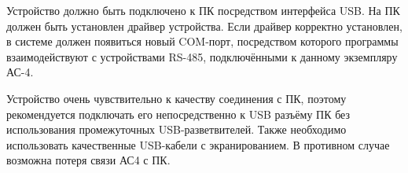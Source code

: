 Устройство должно быть подключено к ПК посредством интерфейса USB. На ПК должен быть установлен драйвер устройства. Если драйвер корректно установлен, в системе должен появиться новый COM-порт, посредством которого программы взаимодействуют с устройствами RS-485, подключёнными к данному экземпляру АС-4.

\IMPORTANT Устройство очень чувствительно к качеству соединения с ПК, поэтому рекомендуется подключать его непосредственно к USB разъёму ПК без использования промежуточных USB-разветвителей. Также необходимо использовать качественные USB-кабели с экранированием. В противном случае возможна потеря связи АС4 с ПК.